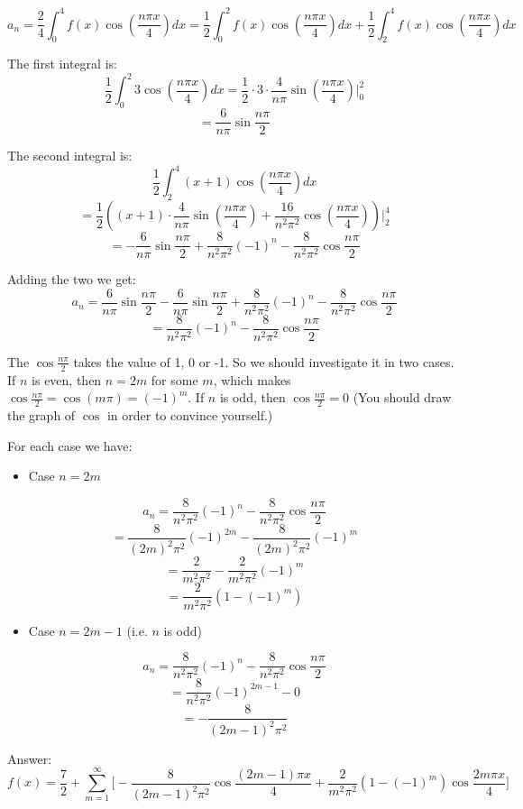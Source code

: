 \documentclass[12pt]{report}
\begin{document}
$$a_n = \frac{2}{4} \int_0^4 f(x) \cos \left(\frac{n\pi x}{4} \right) dx = \frac{1}{2} \int_0^2 f(x) \cos \left(\frac{n\pi x}{4} \right) dx +\frac{1}{2} \int_2^4 f(x) \cos \left(\frac{n\pi x}{4} \right) dx$$

The first integral is:
$$ \frac{1}{2} \int_0^2 3 \cos \left(\frac{n\pi x}{4} \right) dx = \frac{1}{2} \cdot 3 \cdot \frac{4}{n\pi} \sin \left(\frac{n\pi x}{4} \right) \Bigg\vert_0^2 $$
$$ = \frac{6}{n\pi} \sin \frac{n\pi}{2} $$

The second integral is:
$$\frac{1}{2} \int_2^4 (x+1) \cos \left(\frac{n\pi x}{4} \right) dx$$
$$ =\frac{1}{2} \left( (x+1) \cdot \frac{4}{n\pi} \sin \left(\frac{n\pi x}{4} \right) +\frac{16}{n^2\pi^2} \cos \left(\frac{n\pi x}{4} \right) \right) \Bigg\vert_2^4 $$
$$ = -\frac{6}{n\pi} \sin \frac{n\pi}{2}+\frac{8}{n^2\pi^2} (-1)^n  - \frac{8}{n^2\pi^2} \cos \frac{n\pi}{2}$$

Adding the two we get:
$$a_n = \frac{6}{n\pi} \sin \frac{n\pi}{2} -\frac{6}{n\pi} \sin \frac{n\pi}{2}+\frac{8}{n^2\pi^2} (-1)^n  - \frac{8}{n^2\pi^2} \cos \frac{n\pi}{2}$$
$$= \frac{8}{n^2\pi^2} (-1)^n  - \frac{8}{n^2\pi^2} \cos \frac{n\pi}{2}$$

The $\cos \frac{n\pi}{2}$ takes the value of 1, 0 or -1. So we should investigate it in two cases. If $n$ is even, then $n=2m$ for some $m$, which makes $\cos \frac{n\pi}{2} = \cos(m\pi) =(-1)^m $. If $n$ is odd, then $\cos \frac{n\pi}{2}=0$ (You should draw the graph of $\cos$ in order to convince yourself.)

For each case we have:
\begin{itemize}
\item  Case $n=2m$
\end{itemize}
$$a_n = \frac{8}{n^2\pi^2} (-1)^n  - \frac{8}{n^2\pi^2} \cos \frac{n\pi}{2}$$
$$ = \frac{8}{(2m)^2\pi^2} (-1)^{2m}  - \frac{8}{(2m)^2\pi^2} (-1)^m $$
$$ = \frac{2}{m^2\pi^2} - \frac{2}{m^2\pi^2} (-1)^m $$
$$ = \frac{2}{m^2\pi^2} \left( 1 - (-1)^m \right) $$

\begin{itemize}
\item  Case $n=2m-1$ (i.e. $n$ is odd)
\end{itemize}
$$a_n = \frac{8}{n^2\pi^2} (-1)^n  - \frac{8}{n^2\pi^2} \cos \frac{n\pi}{2}$$
$$= \frac{8}{n^2\pi^2} (-1)^{2m-1} -0$$
$$ =  - \frac{8}{(2m-1)^2\pi^2}$$

Answer:
$$f(x) = \frac{7}{2} + \sum_{m=1}^{\infty} \Big[ - \frac{8}{(2m-1)^2\pi^2} \cos \frac{(2m-1)\pi x}{4} + \frac{2}{m^2\pi^2} \left( 1 - (-1)^m \right) \cos \frac{2m\pi x}{4} \Big]$$
\end{document}
